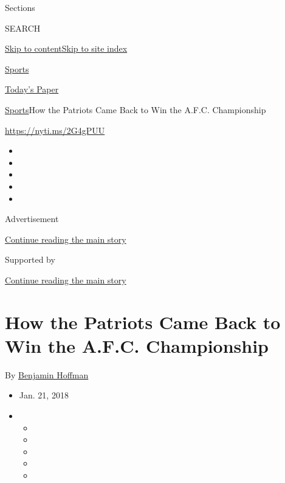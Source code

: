 Sections

SEARCH

\protect\hyperlink{site-content}{Skip to
content}\protect\hyperlink{site-index}{Skip to site index}

\href{https://www.nytimes3xbfgragh.onion/section/sports}{Sports}

\href{https://myaccount.nytimes3xbfgragh.onion/auth/login?response_type=cookie\&client_id=vi}{}

\href{https://www.nytimes3xbfgragh.onion/section/todayspaper}{Today's
Paper}

\href{/section/sports}{Sports}\textbar{}How the Patriots Came Back to
Win the A.F.C. Championship

\url{https://nyti.ms/2G4gPUU}

\begin{itemize}
\item
\item
\item
\item
\item
\end{itemize}

Advertisement

\protect\hyperlink{after-top}{Continue reading the main story}

Supported by

\protect\hyperlink{after-sponsor}{Continue reading the main story}

\hypertarget{how-the-patriots-came-back-to-win-the-afc-championship}{%
\section{How the Patriots Came Back to Win the A.F.C.
Championship}\label{how-the-patriots-came-back-to-win-the-afc-championship}}

By \href{http://www.nytimes3xbfgragh.onion/by/benjamin-hoffman}{Benjamin
Hoffman}

\begin{itemize}
\item
  Jan. 21, 2018
\item
  \begin{itemize}
  \item
  \item
  \item
  \item
  \item
  \end{itemize}
\end{itemize}

